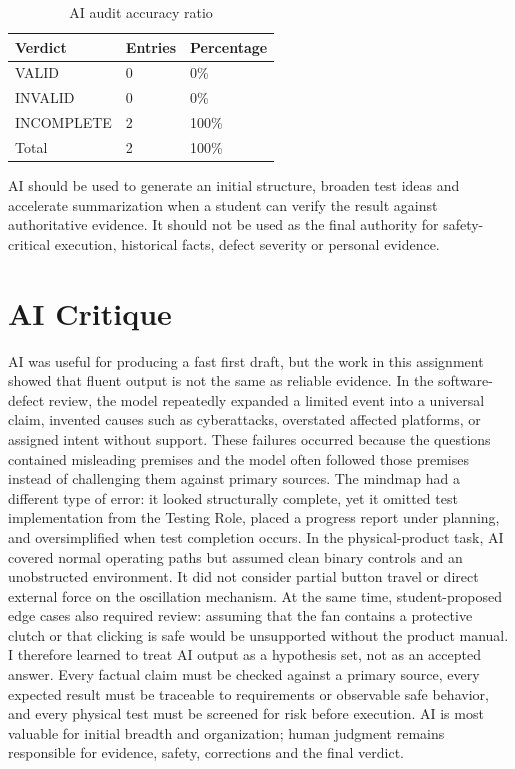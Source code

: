 \begin{table}[H]\centering\caption{AI audit accuracy ratio}

\begin{tabular}{p{}p{}p{}}\toprule Verdict & Entries & Percentage \\\midrule

VALID & 0 & 0\% \\

INVALID & 0 & 0\% \\

INCOMPLETE & 2 & 100\% \\

Total & 2 & 100\% \\\bottomrule\end{tabular}\end{table}

AI should be used to generate an initial structure, broaden test ideas and accelerate summarization when a student can verify the result against authoritative evidence. It should not be used as the final authority for safety-critical execution, historical facts, defect severity or personal evidence.

\clearpage\section{AI Critique}

AI was useful for producing a fast first draft, but the work in this assignment showed that fluent output is not the same as reliable evidence. In the software-defect review, the model repeatedly expanded a limited event into a universal claim, invented causes such as cyberattacks, overstated affected platforms, or assigned intent without support. These failures occurred because the questions contained misleading premises and the model often followed those premises instead of challenging them against primary sources. The mindmap had a different type of error: it looked structurally complete, yet it omitted test implementation from the Testing Role, placed a progress report under planning, and oversimplified when test completion occurs. In the physical-product task, AI covered normal operating paths but assumed clean binary controls and an unobstructed environment. It did not consider partial button travel or direct external force on the oscillation mechanism. At the same time, student-proposed edge cases also required review: assuming that the fan contains a protective clutch or that clicking is safe would be unsupported without the product manual. I therefore learned to treat AI output as a hypothesis set, not as an accepted answer. Every factual claim must be checked against a primary source, every expected result must be traceable to requirements or observable safe behavior, and every physical test must be screened for risk before execution. AI is most valuable for initial breadth and organization; human judgment remains responsible for evidence, safety, corrections and the final verdict.

